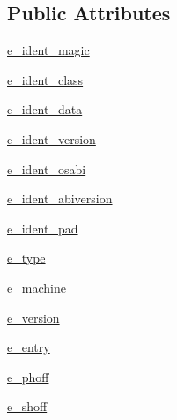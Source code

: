 \subsection*{Public Attributes}
\begin{DoxyCompactItemize}
\item 
\hyperlink{classsetuptools_1_1__vendor_1_1packaging_1_1tags_1_1__ELFFileHeader_a5ad21b01026b5a68b66ec1159a33e3b0}{e\+\_\+ident\+\_\+magic}
\item 
\hyperlink{classsetuptools_1_1__vendor_1_1packaging_1_1tags_1_1__ELFFileHeader_aebd1ddfbc8d23269aa67f7094c61c191}{e\+\_\+ident\+\_\+class}
\item 
\hyperlink{classsetuptools_1_1__vendor_1_1packaging_1_1tags_1_1__ELFFileHeader_a2e1246793d58a4ae8657bcef803c01f8}{e\+\_\+ident\+\_\+data}
\item 
\hyperlink{classsetuptools_1_1__vendor_1_1packaging_1_1tags_1_1__ELFFileHeader_a7e23da37f2fb1b5cf3e659325cda6349}{e\+\_\+ident\+\_\+version}
\item 
\hyperlink{classsetuptools_1_1__vendor_1_1packaging_1_1tags_1_1__ELFFileHeader_ac81b04bff617173a634d290283a004a0}{e\+\_\+ident\+\_\+osabi}
\item 
\hyperlink{classsetuptools_1_1__vendor_1_1packaging_1_1tags_1_1__ELFFileHeader_a2e5e7caaa8bbd07b4212504eca7aa9a7}{e\+\_\+ident\+\_\+abiversion}
\item 
\hyperlink{classsetuptools_1_1__vendor_1_1packaging_1_1tags_1_1__ELFFileHeader_a3011d72afe191d2d5eb8d8236a35e4d8}{e\+\_\+ident\+\_\+pad}
\item 
\hyperlink{classsetuptools_1_1__vendor_1_1packaging_1_1tags_1_1__ELFFileHeader_a51cd093870294c52e3f58c0cde3495f0}{e\+\_\+type}
\item 
\hyperlink{classsetuptools_1_1__vendor_1_1packaging_1_1tags_1_1__ELFFileHeader_ab164b92e6fb1f848c24ab8baf3403761}{e\+\_\+machine}
\item 
\hyperlink{classsetuptools_1_1__vendor_1_1packaging_1_1tags_1_1__ELFFileHeader_a63b170ca73dd5b17574ffc12dd5fc4ac}{e\+\_\+version}
\item 
\hyperlink{classsetuptools_1_1__vendor_1_1packaging_1_1tags_1_1__ELFFileHeader_ac2b0a5b1986082c24bcc7fc543d33541}{e\+\_\+entry}
\item 
\hyperlink{classsetuptools_1_1__vendor_1_1packaging_1_1tags_1_1__ELFFileHeader_a7761bae7642a319196422a764c8350a7}{e\+\_\+phoff}
\item 
\hyperlink{classsetuptools_1_1__vendor_1_1packaging_1_1tags_1_1__ELFFileHeader_af48c4d3bb3d906de774b9e2af076d6c4}{e\+\_\+shoff}

\end{DoxyCompactItemize}
